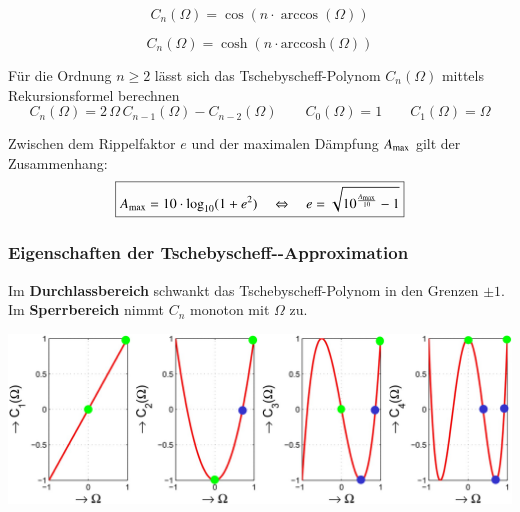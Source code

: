 \vspace{0.2cm}

\begin{minipage}[c]{0.48\columnwidth}
    \begin{center}
        $$ \boxed{ C_n(\Omega) = \cos(n \cdot \arccos(\Omega)) } $$
    \end{center}
    
\end{minipage}
\hfill
\begin{minipage}[c]{0.48\columnwidth}
    \begin{center}
        $$ \boxed{ C_n(\Omega) = \cosh(n \cdot \mathrm{arccosh}(\Omega)) } $$
    \end{center}
\end{minipage}

\vspace{0.2cm}
Für die Ordnung $n \geq 2$ lässt sich das Tschebyscheff-Polynom $C_n(\Omega)$ mittels Rekursionsformel berechnen
$$ \boxed{ C_n(\Omega) = 2 \, \Omega \, C_{n-1}(\Omega) - C_{n-2}(\Omega) }  \qquad C_0(\Omega) = 1 \qquad C_1(\Omega) = \Omega $$

Zwischen dem Rippelfaktor $e$ und der maximalen Dämpfung $A_{\rm max}$ gilt der Zusammenhang:
$$ \boxed{ A_{\rm max} = 10 \cdot \log_{10}(1 + e^2) \quad \Leftrightarrow \quad e = \sqrt{10^{\frac{A_{\rm max}}{10}} -1} } $$


\subsubsection{Eigenschaften der Tschebyscheff--Approximation}

Im \textbf{Durchlassbereich} schwankt das Tschebyscheff-Polynom in den Grenzen $\pm 1$. Im \textbf{Sperrbereich} nimmt
$C_n$ monoton mit $\Omega$ zu.

\begin{center}
    \includegraphics[width=0.8\columnwidth]{images/filter_tschebyscheff_ordnung_ablesen.png}
\end{center}



